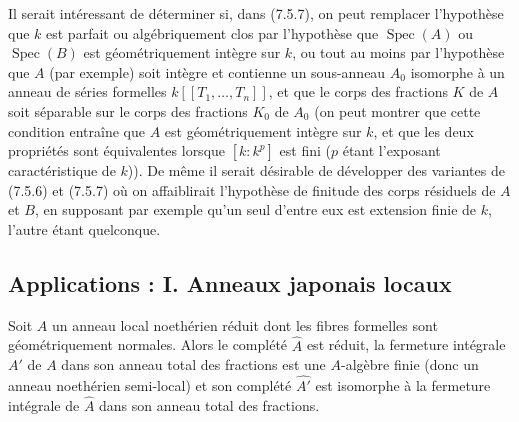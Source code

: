 \begin{remark}[7.5.8]
\label{IV.2.s7.5.8-fr}
Il serait intéressant de déterminer si, dans (7.5.7), on peut remplacer
l'hypothèse que $k$ est parfait ou algébriquement clos par l'hypothèse que
$\operatorname{Spec}(A)$ ou $\operatorname{Spec}(B)$ est géométriquement
intègre sur $k$, ou tout au moins par l'hypothèse que $A$ (par exemple) soit
intègre et contienne un sous-anneau $A_0$ isomorphe à un anneau de séries
formelles $k[[T_1,\ldots,T_n]]$, et que le corps des fractions $K$ de $A$ soit
séparable sur le corps des fractions $K_0$ de $A_0$ (on peut montrer que cette
condition entraîne que $A$ est géométriquement intègre sur $k$, et que les
deux propriétés sont équivalentes lorsque $[k:k^p]$ est fini ($p$ étant
l'exposant caractéristique de $k$)). De même il serait désirable de développer
des variantes de (7.5.6) et (7.5.7) où on affaiblirait l'hypothèse de finitude
des corps résiduels de $A$ et $B$, en supposant par exemple qu'un seul d'entre
eux est extension finie de $k$, l'autre étant quelconque.
\end{remark}

\subsection{Applications : I. Anneaux japonais locaux}
\label{IV.2.ss7.6-fr}

\begin{proposition}[7.6.1]
\label{IV.2.s7.6.1-fr}
Soit $A$ un anneau local noethérien réduit dont les fibres formelles sont
géométriquement normales. Alors le complété $\widehat A$ est réduit, la
fermeture intégrale $A'$ de $A$ dans son anneau total des fractions est une
$A$-algèbre finie (donc un anneau noethérien semi-local) et son complété
$\widehat{A'}$ est isomorphe à la fermeture intégrale de $\widehat A$ dans son
anneau total des fractions.
\end{proposition}

